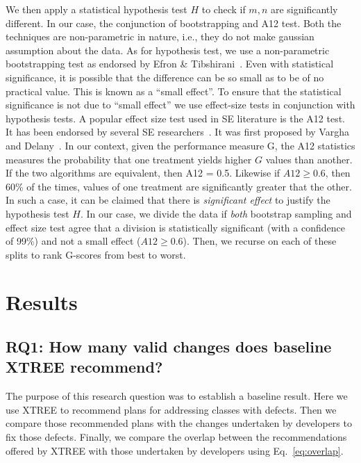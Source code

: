 \documentclass[sigconf, proceedings, 9pt]{acmart}
\newcommand{\eq}[1]{Eq.~\ref{eq:#1}}
\begin{document}
We then apply a statistical hypothesis test $H$ to check
if $m,n$ are significantly different. In our case, the conjunction of 
bootstrapping and A12 test. Both the techniques are non-parametric in nature, 
i.e., they do not make gaussian assumption about the data. As for hypothesis 
test, we use a non-parametric bootstrapping test as endorsed by Efron \& 
Tibshirani~\cite[p220-223]{efron93}. Even with statistical significance, it is 
possible that the difference
	can be so small as to be of no practical value. This is known as a ``small 
	effect''. To ensure that the statistical significance is not due to ``small 
	effect'' we use effect-size tests in conjunction with hypothesis tests. A 
	popular effect size test used in SE literature is the A12 test. It has been 
	endorsed by several SE researchers~\cite{leech2002call, poulding10, arcuri11, 
	shepperd12a, kampenes07, Kocaguneli2013:ep}. It was first proposed by Vargha 
	and Delany~\cite{vargha2000}. In our context,
	given the performance measure 
	G, the A12 statistics measures the
	probability that one treatment yields higher $G$ values than another. If the 
	two algorithms are equivalent, then A12 = 0.5. Likewise if $A12 \ge 0.6$, then 
	60\% of the times, values of one treatment are significantly greater that the 
	other. In such a case, it can be claimed that there is \textit{significant 
	effect} to justify the hypothesis test $H$. In our case, we divide the data if 
	\textit{both} bootstrap sampling and effect size test agree that a division is 
	statistically significant (with a
	confidence of 99\%) and not a small effect ($A12 \ge 0.6$). Then, we recurse 
	on each of these splits to rank G-scores from best to worst.




\section{Results}
\label{sect:results}

\subsection*{\textbf{RQ1: How many valid changes does baseline XTREE 
recommend?}}


The purpose of this research question was to establish a baseline result. Here 
we use XTREE to recommend plans for addressing classes with defects. Then we 
compare those recommended plans with the changes undertaken by developers to 
fix those defects. Finally, we compare the overlap between the recommendations 
offered by XTREE with those undertaken by developers using \eq{overlap}.
\end{document}
